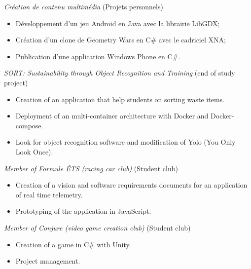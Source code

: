 \documentclass{res}
\newcommand{\inEnglish}[1]{#1}
\begin{document}
\begin{resume}
{	{\sl Création de contenu multimédia} \hfill (Projets personnels)
	\vspace{0.05in}
	\begin{itemize} \itemsep -2pt
		\item Développement d’un jeu Android en Java avec la librairie LibGDX;
		\item Création d’un clone de Geometry Wars en C\# avec le cadriciel XNA;
		\item Publication d’une application Windows Phone en C\#.
	\end{itemize}
}

\inEnglish{
	{\sl SORT: Sustainability through Object Recognition and Training} \hfill (end of study project)
	\vspace{0.05in}
	\begin{itemize} \itemsep -2pt
		\item Creation of an application that help students on sorting waste items.
		\item Deployment of an multi-container architecture with Docker and Docker-compose.
		\item Look for object recognition software and modification of Yolo (You Only Look Once).
	\end{itemize}

	{\sl Member of Formule ÉTS (racing car club)} \hfill (Student club)
	\vspace{0.05in}
	\begin{itemize} \itemsep -2pt
		\item Creation of a vision and software requirements documents for an application of real time telemetry.
		\item Prototyping of the application in JavaScript.
	\end{itemize}

	{\sl Member of Conjure (video game creation club)} \hfill (Student club)
	\vspace{0.05in}
	\begin{itemize} \itemsep -2pt
		\item Creation of a game in C\# with Unity.
		\item Project management.
	\end{itemize}


}
\end{resume}
\end{document}
